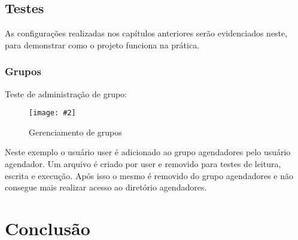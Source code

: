 \documentclass[
	12pt,				%
	openany,			%
	a4paper,			%
	chapter=TITLE,		%
	section=TITLE,		%
	english,
	brazil				%
]{abntex2}
\newcommand{\includeImage}[3] {

\begin{figure}[H]
 	 \centering
  		\texttt{[image: \#2]}
  	\caption{#3}
\end{figure}

}
\begin{document}
\section{Testes}

As configurações realizadas nos capítulos anteriores serão evidenciados neste, para demonstrar como o projeto funciona na prática.

\subsection{Grupos}

Teste de administração de grupo:

\includeImage{0.8}{imgs/5_gerenciamento_grupos/permissao_restringida_apenas_para_os_grupos.png}{Gerenciamento de grupos}

Neste exemplo o usuário user é adicionado ao grupo agendadores pelo usuário agendador. Um arquivo é criado por user e removido para testes de leitura, escrita e execução. Após isso o mesmo é removido do grupo agendadores e não consegue mais realizar acesso ao diretório agendadores.

\chapter{Conclusão}
\end{document}
